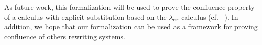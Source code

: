 \documentclass{llncs}
\begin{document}
As future work, this formalization will be used to prove the
confluence property of a calculus with explicit substitution based on
the $\lambda_{ex}$-calculus (cf. ~\cite{kes09}). In addition, we hope
that our formalization can be used as a framework for proving
confluence of others rewriting systems.



\end{document}
